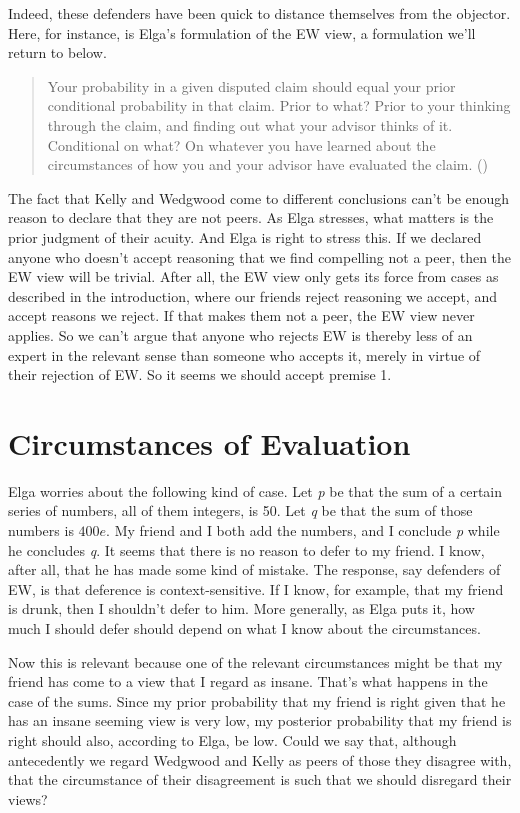 \documentclass[
  10pt,
  letterpaper,
  DIV=11,
  numbers=noendperiod,
  twoside]{scrartcl}
\begin{document}
Indeed, these defenders have been quick to distance themselves from the
objector. Here, for instance, is Elga's formulation of the EW view, a
formulation we'll return to below.

\begin{quote}
Your probability in a given disputed claim should equal your prior
conditional probability in that claim. Prior to what? Prior to your
thinking through the claim, and finding out what your advisor thinks of
it. Conditional on what? On whatever you have learned about the
circumstances of how you and your advisor have evaluated the claim.
()
\end{quote}

The fact that Kelly and Wedgwood come to different conclusions can't be
enough reason to declare that they are not peers. As Elga stresses, what
matters is the prior judgment of their acuity. And Elga is right to
stress this. If we declared anyone who doesn't accept reasoning that we
find compelling not a peer, then the EW view will be trivial. After all,
the EW view only gets its force from cases as described in the
introduction, where our friends reject reasoning we accept, and accept
reasons we reject. If that makes them not a peer, the EW view never
applies. So we can't argue that anyone who rejects EW is thereby less of
an expert in the relevant sense than someone who accepts it, merely in
virtue of their rejection of EW. So it seems we should accept premise 1.

\section{Circumstances of Evaluation}\label{circumstances-of-evaluation}

Elga worries about the following kind of case. Let \emph{p} be that the
sum of a certain series of numbers, all of them integers, is 50. Let
\emph{q} be that the sum of those numbers is \(400e\). My friend and I
both add the numbers, and I conclude \emph{p} while he concludes
\emph{q}. It seems that there is no reason to defer to my friend. I
know, after all, that he has made some kind of mistake. The response,
say defenders of EW, is that deference is context-sensitive. If I know,
for example, that my friend is drunk, then I shouldn't defer to him.
More generally, as Elga puts it, how much I should defer should depend
on what I know about the circumstances.

Now this is relevant because one of the relevant circumstances might be
that my friend has come to a view that I regard as insane. That's what
happens in the case of the sums. Since my prior probability that my
friend is right given that he has an insane seeming view is very low, my
posterior probability that my friend is right should also, according to
Elga, be low. Could we say that, although antecedently we regard
Wedgwood and Kelly as peers of those they disagree with, that the
circumstance of their disagreement is such that we should disregard
their views?
\end{document}
